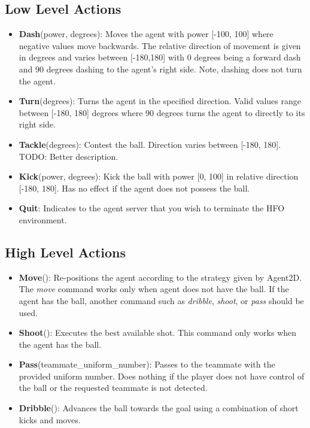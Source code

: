 \documentclass[12pt]{article}
\begin{document}
\subsection{Low Level Actions}
\begin{itemize}
\item{\textbf{Dash}(power, degrees): Moves the agent with power [-100,
    100] where negative values move backwards. The relative direction
  of movement is given in degrees and varies between [-180,180] with 0
  degrees being a forward dash and 90 degrees dashing to the agent's
  right side. Note, dashing does not turn the agent.}
\item{\textbf{Turn}(degrees): Turns the agent in the
  specified direction. Valid values range between [-180, 180] degrees
  where 90 degrees turns the agent to directly to its right side.}
\item{\textbf{Tackle}(degrees): Contest the ball. Direction
  varies between [-180, 180]. TODO: Better description.}
\item{\textbf{Kick}(power, degrees): Kick the ball with power [0, 100]
  in relative direction [-180, 180]. Has no effect if the agent does
  not possess the ball.}
\item{\textbf{Quit}: Indicates to the agent server that you wish to
  terminate the HFO environment.}
\end{itemize}

\subsection{High Level Actions}
\begin{itemize}
\item{\textbf{Move}(): Re-positions the agent according to the
  strategy given by Agent2D. The \textit{move} command works only when
  agent does not have the ball. If the agent has the ball, another
  command such as \textit{dribble}, \textit{shoot}, or \textit{pass}
  should be used.}
\item{\textbf{Shoot}(): Executes the best available shot. This command
  only works when the agent has the ball.}
\item{\textbf{Pass}(teammate\_uniform\_number): Passes to the teammate
  with the provided uniform number. Does nothing if the player does
  not have control of the ball or the requested teammate is not
  detected.}
\item{\textbf{Dribble}(): Advances the ball towards the goal using a
  combination of short kicks and moves.}
\end{itemize}



\end{document}
